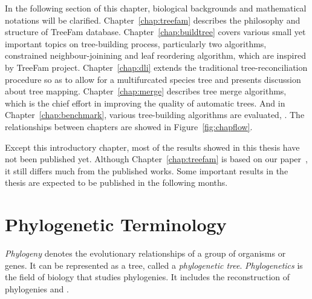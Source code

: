 In the following section of this chapter,  biological backgrounds and mathematical
notations will be clarified. Chapter~\ref{chap:treefam} describes the philosophy and structure of  TreeFam database.
Chapter~\ref{chap:buildtree} covers various small yet important topics on  tree-building process, particularly
two algorithms, constrained neighbour-joinining and leaf reordering algorithm, which
are inspired by  TreeFam project. Chapter~\ref{chap:dli} extends the traditional
tree-reconciliation procedure so as to allow for a multifurcated species tree
and presents discussion about tree mapping. Chapter~\ref{chap:merge} describes tree merge algorithms,
which is the chief effort in improving the quality of automatic trees.
And in Chapter~\ref{chap:benchmark}, various tree-building algorithms are evaluated, . The relationships between chapters are showed in Figure~\ref{fig:chapflow}.

Except this introductory chapter, most of the results showed in this thesis have not been published yet.
Although Chapter~\ref{chap:treefam} is based on our paper~\cite{li06}, it still differs much from
the published works. Some important results in the thesis are expected to be published in the following months.

\section{Phylogenetic Terminology}
\emph{Phylogeny} denotes the evolutionary relationships of a group of organisms or genes.
It can be represented as a tree, called a \emph{phylogenetic tree}.
\emph{Phylogenetics} is the field of biology that studies phylogenies.
It includes the reconstruction of phylogenies and .

